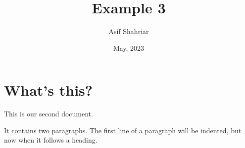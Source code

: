 \documentclass[a4paper, 11pt]{article}
\begin{document}
\title{Example 3}
\author{Asif Shahriar}
\date{May, 2023}

\maketitle

\section{What's this?}
This        is  our
second document. 

It contains two paragraphs. The first line of a paragraph will be 
indented, but now when it follows a heading. 
\end{document}
